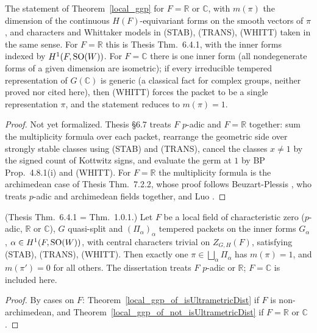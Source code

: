 \begin{theorem}[The main theorem for $F=\mathbb R,\mathbb C$]
\label{local_ggp_of_not_isUltrametricDist}
\leanok
{}
The statement of Theorem~\ref{local_ggp} for $F=\mathbb R$ or $\mathbb C$, with $m(\pi)$ the dimension of
the continuous $H(F)$-equivariant forms on the smooth vectors of $\pi$, and characters and Whittaker
models in (STAB), (TRANS), (WHITT) taken in the same sense. For $F=\mathbb R$ this is Thesis Thm.~6.4.1,
with the inner forms indexed by $H^1(F,\mathrm{SO}(W))$. For $F=\mathbb C$ there is one inner form (all nondegenerate
forms of a given dimension are isometric); if every irreducible tempered representation of $G(\mathbb C)$ is
generic (a classical fact for complex groups, neither proved nor cited here), then (WHITT) forces the packet
to be a single representation $\pi$, and the statement reduces to $m(\pi)=1$.
\end{theorem}
\begin{proof}
Not yet formalized. Thesis \S6.7 treats $F$ $p$-adic and $F=\mathbb R$ together: sum the multiplicity
formula over each packet, rearrange the geometric side over strongly stable classes using (STAB) and
(TRANS), cancel the classes $x\neq1$ by the signed count of Kottwitz signs, and evaluate the germ at $1$
by BP Prop.~4.8.1(i) and (WHITT). For $F=\mathbb R$ the multiplicity formula is the archimedean case of
Thesis Thm.~7.2.2, whose proof follows Beuzart-Plessis \cite{BP}, who treats $p$-adic and archimedean
fields together, and Luo \cite{Luo}.
\end{proof}

\begin{theorem}
\label{local_ggp}
\leanok
{}
(Thesis Thm.~6.4.1 = Thm.~1.0.1.) Let $F$ be a local field of characteristic zero ($p$-adic, $\mathbb R$ or
$\mathbb C$), $G$ quasi-split and $(\Pi_\alpha)_\alpha$ tempered packets on the inner forms $G_\alpha$,
$\alpha\in H^1(F,\mathrm{SO}(W))$, with central characters trivial on $Z_{G,H}(F)$, satisfying (STAB), (TRANS),
(WHITT). Then exactly one $\pi\in\bigsqcup_\alpha\Pi_\alpha$ has $m(\pi)=1$, and $m(\pi')=0$ for all others.
The dissertation treats $F$ $p$-adic or $\mathbb R$; $F=\mathbb C$ is included here.
\end{theorem}
\begin{proof}
\leanok
{}
By cases on $F$: Theorem~\ref{local_ggp_of_isUltrametricDist} if $F$ is non-archimedean, and
Theorem~\ref{local_ggp_of_not_isUltrametricDist} if $F=\mathbb R$ or $\mathbb C$.
\end{proof}
